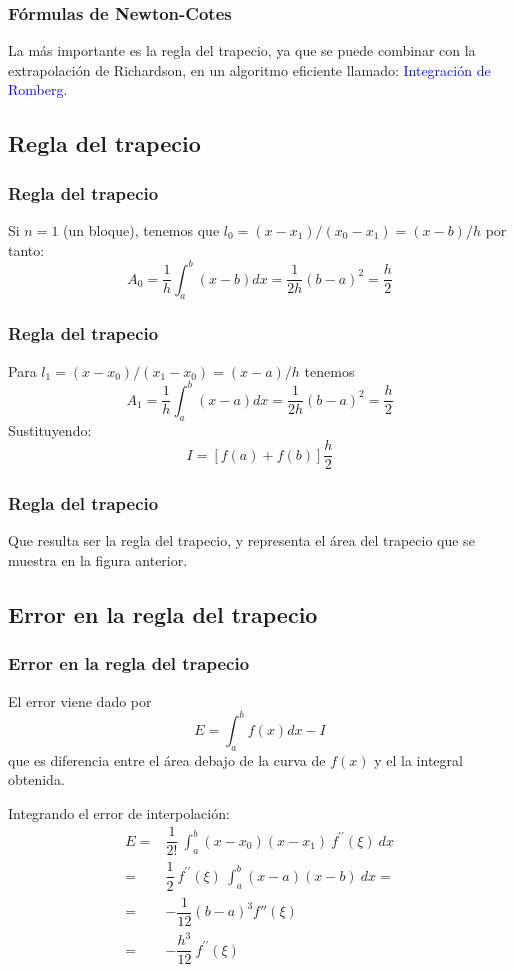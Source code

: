 \begin{frame}
\frametitle{Fórmulas de Newton-Cotes}
La más importante es la regla del trapecio, ya que se puede combinar con la extrapolación de Richardson, en un algoritmo eficiente llamado: \textcolor{blue}{Integración de Romberg}.
\end{frame}
\subsection{Regla del trapecio}
\begin{frame}
\frametitle{Regla del trapecio}
\begin{figure}
	\centering
	
\end{figure}
Si $n = 1$ (un bloque), tenemos que $l_{0} = (x-x_{1})/(x_{0}-x_{1})= (x-b)/h$ por tanto:
\[A_{0} = \dfrac{1}{h} \int_{a}^{b} (x - b) dx = \dfrac{1}{2h} (b - a)^{2}= \dfrac{h}{2}\]
\end{frame}
\begin{frame}
\frametitle{Regla del trapecio}
Para $l_{1} = (x-x_{0})/(x_{1}-x_{0}) = (x-a)/h$ tenemos
\[A_{1} = \dfrac{1}{h} \int_{a}^{b} (x-a) dx = \dfrac{1}{2h} (b-a)^{2}= \dfrac{h}{2}\]
Sustituyendo:
\[I = \left[ f(a) + f(b) \right] \dfrac{h}{2}\]
\end{frame}
\begin{frame}
\frametitle{Regla del trapecio}
\begin{figure}
	\centering
	
\end{figure}
Que resulta ser la regla del trapecio, y representa el área del trapecio que se muestra en la figura anterior.
\end{frame}
\subsection{Error en la regla del trapecio}
\begin{frame}
\frametitle{Error en la regla del trapecio}
El error viene dado por
\[ E = \int_{a}^{b} f(x) dx - I \]
que es diferencia entre el área debajo de la curva de $f(x)$ y el la integral obtenida. 
\end{frame}
\begin{frame}
Integrando el error de interpolación:
\[ \begin{split} 
E =& \dfrac{1}{2!} \: \int_{a}^{b} (x - x_{0})(x - x_{1}) \: f^{\prime \prime}(\xi) \: dx  \\
=& \dfrac{1}{2} \: f^{\prime \prime}(\xi) \: \int_{a}^{b} (x - a)(x - b) \: dx = \\
=& -\dfrac{1}{12}(b-a)^{3} f''(\xi) \\
=& -\dfrac{h^{3}}{12} \: f^{\prime \prime}(\xi) \\
\end{split} \]
\end{frame}
